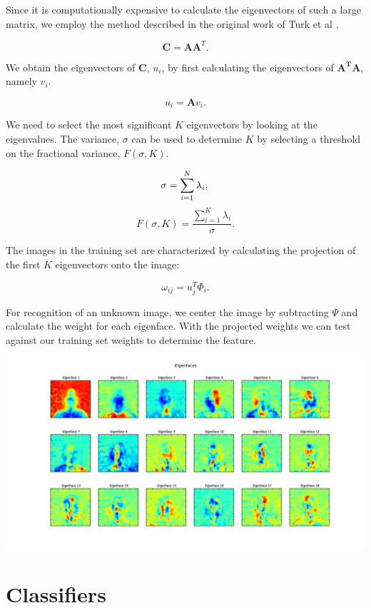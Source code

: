 \documentclass{article} %
\begin{document}
Since it is computationally expensive to calculate the eigenvectors of such a large matrix, we employ the method described in the original work of Turk et al \cite{tur91}.  

\[
	\mathbf{C} = \mathbf{A} \mathbf{A}^T.
\]

We obtain the eigenvectors of $\mathbf{C}$, $u_i$, by first calculating the eigenvectors of $\mathbf{A^T A}$, namely $v_i$.  

\[
	u_i = \mathbf{A} v_i.
\]

We need to select the most significant $K$ eigenvectors by looking at the eigenvalues.  The variance, $\sigma$ can be used to determine $K$ by selecting a threshold on the fractional variance, $F(\sigma, K)$.

\[
	\sigma = \sum_{i=1}^{N} \lambda_i, \\
\]
\[
	F(\sigma, K) = \frac{\sum_{i=1}^{K} \lambda_i}{\sigma}.
\]

The images in the training set are characterized by calculating the projection of the first $K$ eigenvectors onto the image:

\[
	\omega_{ij} = u_j^T \Phi_i.
\]

For recognition of an unknown image, we center the image by subtracting $\Psi$ and calculate the weight for each eigenface.  With the projected weights we can test against our training set weights to determine the feature.  

\begin{minipage}{\linewidth}
	\centering
	\includegraphics[width=1.0\linewidth]{fig/eigenfaces.pdf}
	\label{fig:eigenfaces}
\end{minipage}

\section{Classifiers}
\end{document}
